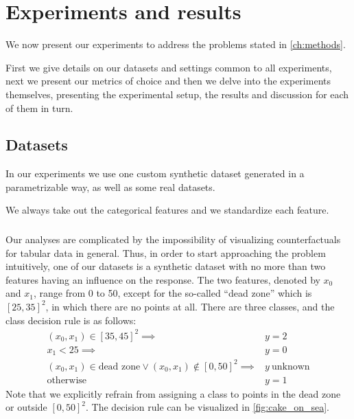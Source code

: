 \documentclass[../main.tex]{subfiles}
\begin{document}
\chapter{Experiments and results}

We now present our experiments to address the problems stated in \autoref{ch:methods}.

First we give details on our datasets and settings common to all experiments, next we present our metrics of choice
and then we delve into the experiments themselves, presenting the experimental setup, the results and
discussion for each of them in turn.

\section{Datasets}
\label{sec:datasets}

In our experiments we use one custom synthetic dataset generated in a parametrizable way, as well as some real datasets.

We always take out the categorical features and we standardize each feature.

\subsection{\CakeOnSea}

Our analyses are complicated by the impossibility of visualizing counterfactuals for tabular data in general.
Thus, in order to start approaching the problem intuitively, one of our datasets is a synthetic dataset with no more than two features having an influence on the response.
The two features, denoted by $x_0$ and $x_1$, range from 0 to 50, except for the so-called ``dead zone'' which is $[25, 35]^2$, in which there are no points at all.
There are three classes, and the class decision rule is as follows:
\begin{align*}
    (x_0, x_1) \in [35, 45]^2 \implies & y = 2 \\
    x_1 < 25                  \implies & y = 0 \\
    (x_0, x_1) \in \text{dead zone} \lor (x_0, x_1) \notin [0, 50]^2  \implies & y\ \text{unknown} \\
    \text{otherwise} \qquad            & y = 1
\end{align*}
Note that we explicitly refrain from assigning a class to points in the dead zone or outside $[0, 50]^2$.
The decision rule can be visualized in \autoref{fig:cake_on_sea}.
\end{document}
